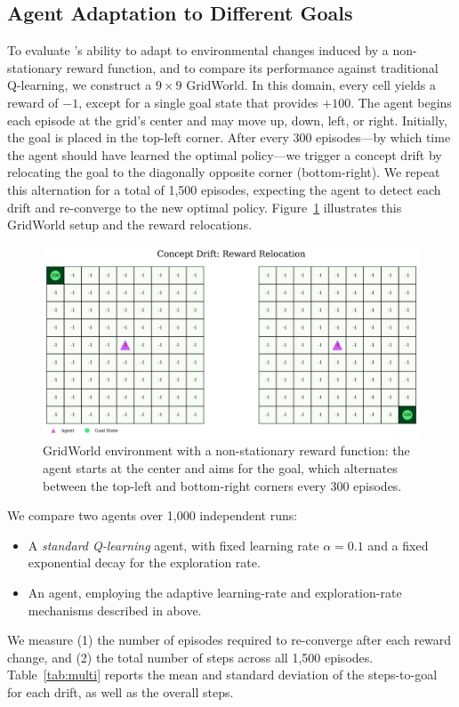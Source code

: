 \subsection{Agent Adaptation to Different Goals}
\label{sec:experiments}

To evaluate \adaptiverl’s ability to adapt to environmental changes induced by a non-stationary reward function, and to compare its performance against traditional Q-learning, we construct a $9\times 9$ GridWorld. In this domain, every cell yields a reward of $-1$, except for a single goal state that provides $+100$. The agent begins each episode at the grid’s center and may move up, down, left, or right. Initially, the goal is placed in the top-left corner. After every 300 episodes—by which time the agent should have learned the optimal policy—we trigger a concept drift by relocating the goal to the diagonally opposite corner (bottom-right). We repeat this alternation for a total of 1,500 episodes, expecting the agent to detect each drift and re-converge to the new optimal policy. Figure~\ref{fig:r-change} illustrates this GridWorld setup and the reward relocations.

\begin{figure}
    \centering
    \includegraphics[width=\textwidth]{figures/rewards_change.png}
    \caption{GridWorld environment with a non-stationary reward function: the agent starts at the center and aims for the goal, which alternates between the top-left and bottom-right corners every 300 episodes.}
    \label{fig:r-change}
\end{figure}

We compare two agents over 1,000 independent runs:  
\begin{itemize}
  \item A \emph{standard Q-learning} agent, with fixed learning rate $\alpha=0.1$ and a fixed exponential decay for the exploration rate.
  \item An \emph{\adaptiverl} agent, employing the adaptive learning-rate and exploration-rate mechanisms described in above.
\end{itemize}
We measure (1) the number of episodes required to re-converge after each reward change, and (2) the total number of steps across all 1,500 episodes. Table~\ref{tab:multi} reports the mean and standard deviation of the steps-to-goal for each drift, as well as the overall steps.  

